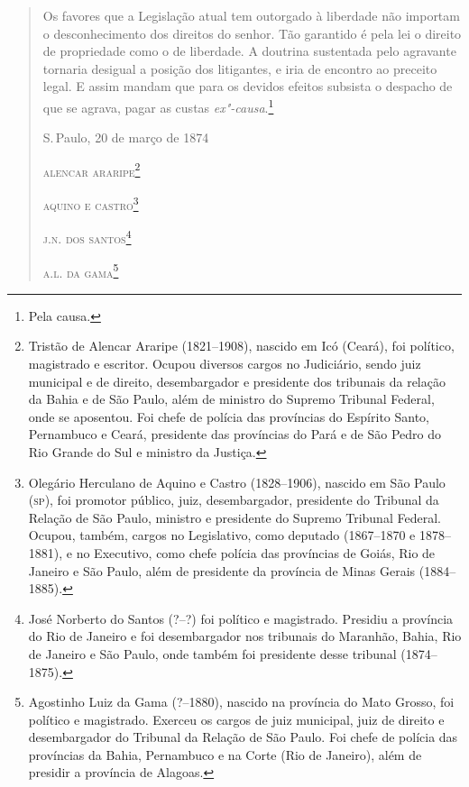 \begin{quote}
Os favores que a Legislação atual tem outorgado à liberdade não importam
o desconhecimento dos direitos do senhor. Tão garantido é pela lei o
direito de propriedade como o de liberdade. A doutrina sustentada pelo
agravante tornaria desigual a posição dos litigantes, e iria de encontro
ao preceito legal. E assim mandam que para os devidos efeitos subsista o
despacho de que se agrava, pagar as custas \emph{ex"-causa}.\footnote{
  Pela causa.}

\medskip

\noindent{}S.\,Paulo, 20 de março de 1874\smallskip

\noindent\textsc{alencar araripe}\footnote{Tristão de Alencar Araripe (1821--1908),
  nascido em Icó (Ceará), foi político, magistrado e escritor. Ocupou
  diversos cargos no Judiciário, sendo juiz municipal e de direito,
  desembargador e presidente dos tribunais da relação da Bahia e de São
  Paulo, além de ministro do Supremo Tribunal Federal, onde se
  aposentou. Foi chefe de polícia das províncias do Espírito Santo,
  Pernambuco e Ceará, presidente das províncias do Pará e de São Pedro
  do Rio Grande do Sul e ministro da Justiça.}

\noindent\textsc{aquino e castro}\footnote{Olegário Herculano de Aquino e Castro
  (1828--1906), nascido em São Paulo (\textsc{sp}), foi promotor público, juiz,
  desembargador, presidente do Tribunal da Relação de São Paulo,
  ministro e presidente do Supremo Tribunal Federal. Ocupou, também,
  cargos no Legislativo, como deputado (1867--1870 e 1878--1881), e no
  Executivo, como chefe polícia das províncias de Goiás, Rio de Janeiro
  e São Paulo, além de presidente da província de Minas Gerais
  (1884--1885).}

\noindent\textsc{j.n. dos santos}\footnote{José Norberto do Santos (?--?) foi político e
  magistrado. Presidiu a província do Rio de Janeiro e foi desembargador
  nos tribunais do Maranhão, Bahia, Rio de Janeiro e São Paulo, onde
  também foi presidente desse tribunal (1874--1875).}

\noindent\textsc{a.l. da gama}\footnote{Agostinho Luiz da Gama (?--1880), nascido na 
  província do Mato Grosso, foi político e magistrado. Exerceu os cargos
  de juiz municipal, juiz de direito e desembargador do Tribunal da
  Relação de São Paulo. Foi chefe de polícia das províncias da Bahia,
  Pernambuco e na Corte (Rio de Janeiro), além de presidir a província
  de Alagoas.} \label{agostinho}
\end{quote}  

\asterisc

